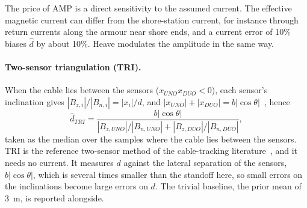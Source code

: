 The price of AMP is a direct sensitivity to the assumed current. The effective magnetic current can differ from the shore-station current, for instance through return currents along the armour near shore ends, and a current error of 10\% biases $\hat{d}$ by about 10\%. Heave modulates the amplitude in the same way.

\paragraph{Two-sensor triangulation (TRI).}
When the cable lies between the sensors ($x_{UNO} x_{DUO} < 0$), each sensor's inclination gives $|B_{z,i}|/|B_{n,i}| = |x_i|/d$, and $|x_{UNO}| + |x_{DUO}| = b|\cos\theta|$~\cite{xiang2016subsea}, hence
\begin{equation}
\hat{d}_{TRI} = \frac{b|\cos\theta|}{|B_{z,UNO}|/|B_{n,UNO}| + |B_{z,DUO}|/|B_{n,DUO}|},
\label{eq:tri}
\end{equation}
taken as the median over the samples where the cable lies between the sensors. TRI is the reference two-sensor method of the cable-tracking literature~\cite{xiang2016subsea,yu2018robust,zhang2024electromagnetic}, and it needs no current. It measures $d$ against the lateral separation of the sensors, $b|\cos\theta|$, which is several times smaller than the standoff here, so small errors on the inclinations become large errors on $d$. The trivial baseline, the prior mean of 3~m, is reported alongside.
